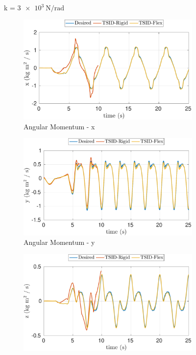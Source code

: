 \begin{figure}[p]
    \begin{myframe}{k = $\SI{3e3}{\newton \per \radian}$}
    \centering
        \begin{subfigure}[b]{0.49\textwidth}
        \centering
        \includegraphics[width=\columnwidth]{chapter_flexible_joints/figures/comparison_3000_angular_momentum_x.pdf}
        \caption{Angular Momentum - x}
    \end{subfigure}
    \hfill
    \begin{subfigure}[b]{0.49\textwidth}
        \centering
        \includegraphics[width=\columnwidth]{chapter_flexible_joints/figures/comparison_3000_angular_momentum_y.pdf}
        \caption{Angular Momentum - y}
    \end{subfigure}
     \begin{subfigure}[b]{0.49\textwidth}
        \centering
        \includegraphics[width=\columnwidth]{chapter_flexible_joints/figures/comparison_3000_angular_momentum_z.pdf}

\end{subfigure}
\end{myframe}
\end{figure}
